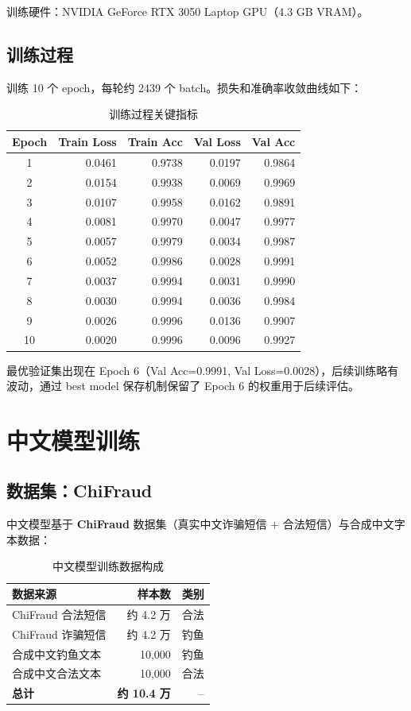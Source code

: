 \documentclass[11pt,a4paper]{article}
\begin{document}
训练硬件：NVIDIA GeForce RTX 3050 Laptop GPU（4.3 GB VRAM）。

\subsection{训练过程}

训练 10 个 epoch，每轮约 2439 个 batch。损失和准确率收敛曲线如下：

\begin{table}[h]
\centering
\caption{训练过程关键指标}
\begin{tabular}{crrrr}
\toprule
Epoch & Train Loss & Train Acc & Val Loss & Val Acc \\
\midrule
1 & 0.0461 & 0.9738 & 0.0197 & 0.9864 \\
2 & 0.0154 & 0.9938 & 0.0069 & 0.9969 \\
3 & 0.0107 & 0.9958 & 0.0162 & 0.9891 \\
4 & 0.0081 & 0.9970 & 0.0047 & 0.9977 \\
5 & 0.0057 & 0.9979 & 0.0034 & 0.9987 \\
6 & 0.0052 & 0.9986 & 0.0028 & 0.9991 \\
7 & 0.0037 & 0.9994 & 0.0031 & 0.9990 \\
8 & 0.0030 & 0.9994 & 0.0036 & 0.9984 \\
9 & 0.0026 & 0.9996 & 0.0136 & 0.9907 \\
10 & 0.0020 & 0.9996 & 0.0096 & 0.9927 \\
\bottomrule
\end{tabular}
\end{table}

最优验证集出现在 Epoch 6（Val Acc=0.9991, Val Loss=0.0028），后续训练略有波动，通过 best model 保存机制保留了 Epoch 6 的权重用于后续评估。

\section{中文模型训练}

\subsection{数据集：ChiFraud}

中文模型基于 \textbf{ChiFraud} 数据集（真实中文诈骗短信 + 合法短信）与合成中文字本数据：

\begin{table}[h]
\centering
\caption{中文模型训练数据构成}
\begin{tabular}{lrr}
\toprule
数据来源 & 样本数 & 类别 \\
\midrule
ChiFraud 合法短信 & 约 4.2 万 & 合法 \\
ChiFraud 诈骗短信 & 约 4.2 万 & 钓鱼 \\
合成中文钓鱼文本 & 10,000 & 钓鱼 \\
合成中文合法文本 & 10,000 & 合法 \\
\midrule
\textbf{总计} & \textbf{约 10.4 万} & -- \\
\bottomrule
\end{tabular}
\end{table}
\end{document}

